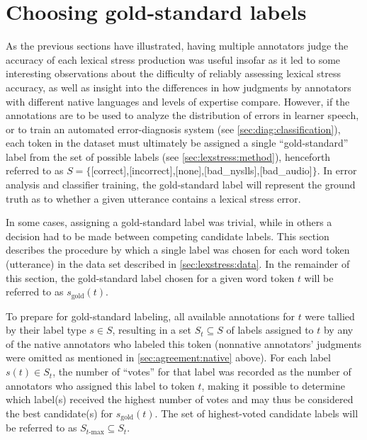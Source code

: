 			
			
		\section{Choosing gold-standard labels}
		\label{sec:agreement:gold}
		
		
		
		As the previous sections have illustrated, having multiple annotators judge the accuracy of each lexical stress production was useful insofar as it led to some interesting observations about the difficulty of reliably assessing lexical stress accuracy, as well as insight into the differences in how judgments by annotators with different native languages and levels of expertise compare. However, if the annotations are to be used to analyze the distribution of errors in learner speech, or to train an automated error-diagnosis system (see \cref{sec:diag:classification}), each token in the dataset must ultimately be assigned a single ``gold-standard'' label from the set of possible labels (see \cref{sec:lexstress:method}), henceforth referred to as $S = \{$[correct],{[incorrect]},{[none]},{[bad\_nyslls]},{[bad\_audio]}$\}$.
		 In error analysis and classifier training, the gold-standard label will represent the ground truth as to whether a given utterance contains a lexical stress error.
		
		In some cases, assigning a gold-standard label was trivial, while in others a decision had to be made between competing candidate labels. This section describes the procedure by which a single label was chosen for each word token (utterance) in the data set described in \cref{sec:lexstress:data}. In the remainder of this section, the gold-standard label chosen for a given word token $t$ will be referred to as $s_{\text{gold}}(t)$.
		
		To prepare for gold-standard labeling, all available annotations for $t$ were tallied by their label type $s \in S$, resulting in a set $S_t \subseteq S$ of labels assigned to $t$ by any of the native annotators who labeled this token (nonnative annotators' judgments were omitted as mentioned in \cref{sec:agreement:native} above). For each label $s(t) \in S_t$, the number of ``votes'' for that label was recorded as the number of annotators who assigned this label to token $t$,
		making it possible to determine which label(s) received the highest number of votes and may thus be considered the best candidate(s) for $s_{\text{gold}}(t)$. The set of highest-voted candidate labels will be referred to as $S_{t\text{-max}} \subseteq S_t$.
		
